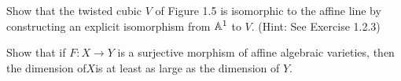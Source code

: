 \documentclass[12pt]{memoir}
\begin{document}
\begin{Ej}
  Show that the twisted cubic $V$ of Figure 1.5 is isomorphic to the affine line by constructing an explicit isomorphism from $\mathbb{A}^1$ to $V$. (Hint: See Exercise 1.2.3)
\end{Ej}

\begin{Ej}
 Show that if $F:X\to Y$ is a surjective morphism of affine
 algebraic varieties, then the dimension of$ X $is at least as large as the dimension of $Y$. 
\end{Ej}
\end{document}
